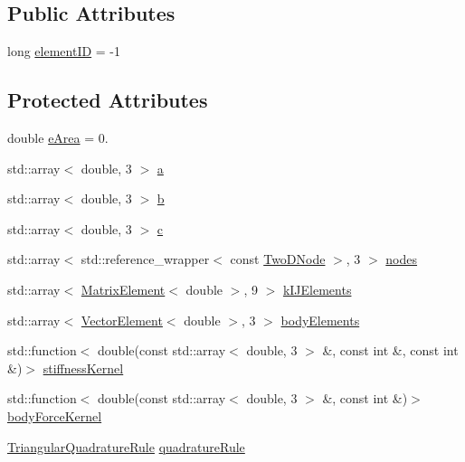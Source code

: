 \subsection*{Public Attributes}
\begin{DoxyCompactItemize}
\item 
long \hyperlink{a00764_a5feb92c27270536c92fcb39c6fecc00d}{element\+ID} = -\/1
\end{DoxyCompactItemize}
\subsection*{Protected Attributes}
\begin{DoxyCompactItemize}
\item 
double \hyperlink{a00764_ab74cbf3ff783201003c53439f79307e4}{e\+Area} = 0.
\item 
std\+::array$<$ double, 3 $>$ \hyperlink{a00764_af5cd851c5a4385f954bfc31b8eca81be}{a}
\item 
std\+::array$<$ double, 3 $>$ \hyperlink{a00764_a6581eba2e216eb5f3e93e047be680a82}{b}
\item 
std\+::array$<$ double, 3 $>$ \hyperlink{a00764_a2a9d18beac7fccf750846723ddf73d1d}{c}
\item 
std\+::array$<$ std\+::reference\+\_\+wrapper$<$ const \hyperlink{a00189_a92dafcc05a788e1065a5792b67f0f70e}{Two\+D\+Node} $>$, 3 $>$ \hyperlink{a00764_a6275d38ed2cfa924b1a36e0f98ce7c16}{nodes}
\item 
std\+::array$<$ \hyperlink{a00189_a1a12603621e7a1efa59ac5cb79f9d509}{Matrix\+Element}$<$ double $>$, 9 $>$ \hyperlink{a00764_a9126763a046ac0736d72b6b5d20ba80d}{k\+I\+J\+Elements}
\item 
std\+::array$<$ \hyperlink{a00189_a08f01d4bb892cf7b2386d0f3a8643d72}{Vector\+Element}$<$ double $>$, 3 $>$ \hyperlink{a00764_a8a85094c0060a67aa1b6abf4a5e660a6}{body\+Elements}
\item 
std\+::function$<$ double(const std\+::array$<$ double, 3 $>$ \&, const int \&, const int \&)$>$ \hyperlink{a00764_ae2480b5335fe78245cb1006e3eeb034d}{stiffness\+Kernel}
\item 
std\+::function$<$ double(const std\+::array$<$ double, 3 $>$ \&, const int \&)$>$ \hyperlink{a00764_a48dbf56bce64a1e97332b03309720154}{body\+Force\+Kernel}
\item 
\hyperlink{a00852}{Triangular\+Quadrature\+Rule} \hyperlink{a00764_a344419454bc8f003713ef5b009c73a65}{quadrature\+Rule}
\end{DoxyCompactItemize}


